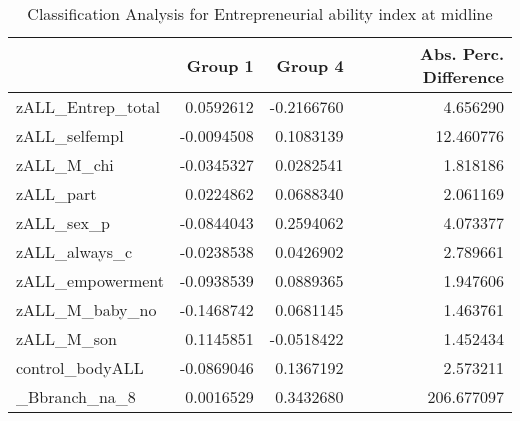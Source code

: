 \begin{table}

\caption{\label{tab:clanREntrep_total}Classification Analysis for Entrepreneurial ability index at midline}
\centering
\begin{tabular}[t]{lrrr}
\toprule
  & Group 1 & Group 4 & Abs. Perc. Difference\\
\midrule
zALL\_Entrep\_total & 0.0592612 & -0.2166760 & 4.656290\\
zALL\_selfempl & -0.0094508 & 0.1083139 & 12.460776\\
zALL\_M\_chi & -0.0345327 & 0.0282541 & 1.818186\\
zALL\_part & 0.0224862 & 0.0688340 & 2.061169\\
zALL\_sex\_p & -0.0844043 & 0.2594062 & 4.073377\\
\addlinespace
zALL\_always\_c & -0.0238538 & 0.0426902 & 2.789661\\
zALL\_empowerment & -0.0938539 & 0.0889365 & 1.947606\\
zALL\_M\_baby\_no & -0.1468742 & 0.0681145 & 1.463761\\
zALL\_M\_son & 0.1145851 & -0.0518422 & 1.452434\\
control\_bodyALL & -0.0869046 & 0.1367192 & 2.573211\\
\addlinespace
\_Bbranch\_na\_8 & 0.0016529 & 0.3432680 & 206.677097\\
\bottomrule
\end{tabular}
\end{table}
